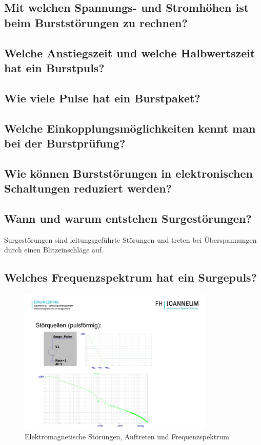 \subsection{Mit welchen Spannungs- und Stromhöhen ist beim Burststörungen zu rechnen?}

\subsection{Welche Anstiegszeit und welche Halbwertszeit hat ein Burstpuls?}

\subsection{Wie viele Pulse hat ein Burstpaket?}

\subsection{Welche Einkopplungsmöglichkeiten kennt man bei der Burstprüfung?}

\subsection{Wie können Burststörungen in elektronischen Schaltungen reduziert werden?}

\subsection{Wann und warum entstehen Surgestörungen?}
Surgestörungen sind leitungsgeführte Störungen und treten bei Überspannungen durch einen Blitzeinschläge auf. 

\subsection{Welches Frequenzspektrum hat ein Surgepuls?}

\begin{figure}[ht]
  \centering
  \includegraphics[height=7cm]{src/assets/pictures/VL_3_surge_pulse.jpg}
  \caption{Elektromagnetische Störungen, Auftreten und Frequenzspektrum}
\end{figure}


